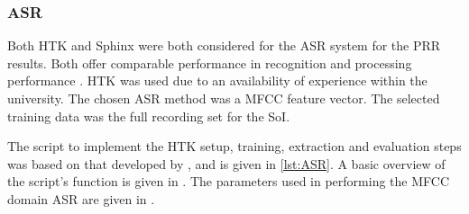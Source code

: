 \subsubsection*{\acl{ASR}}

Both \ac{HTK} and Sphinx were both considered for the \ac{ASR} system
for the \ac{PRR} results. Both offer comparable performance in recognition
and processing performance \citep{Vertanen2006}. \ac{HTK} was used
due to an availability of experience within the university. The chosen
\ac{ASR} method was a \ac{MFCC} feature vector. The selected training
data was the full recording set for the \ac{SoI}.

The script to implement the \ac{HTK} setup, training, extraction
and evaluation steps was based on that developed by \citet{Quill2014},
and is given in \ref{lst:ASR}. A basic overview of the script's function
is given in . The parameters used in performing the \ac{MFCC}
domain \ac{ASR} are given in .

